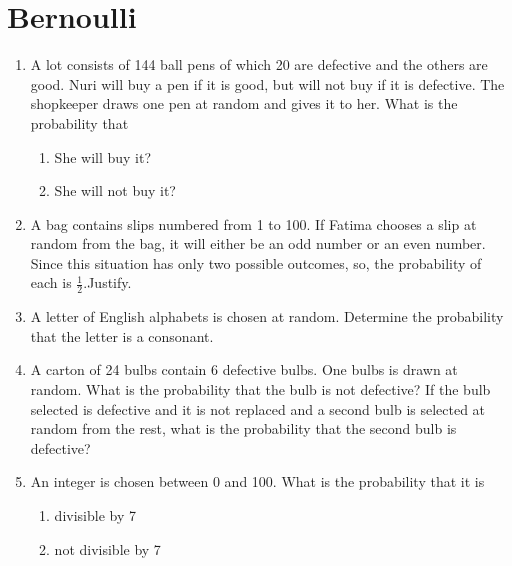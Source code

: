 \section{Bernoulli}
\begin{enumerate}[label=\thesection.\arabic*,ref=\thesection.\theenumi]
	\item A lot consists of 144 ball pens of which 20 are defective and the 
    others are good. Nuri will buy a pen if it is good, but will not buy if it 
    is defective. The shopkeeper draws one pen at random and gives it to her. 
    What is the probability that
    \begin{enumerate}
        \item She will buy it?
        \item She will not buy it?
    \end{enumerate}
\solution

\item A bag contains slips numbered from 1 to 100. If Fatima chooses a slip at random
from the bag, it will either be an odd number or an even number. Since this situation
has only two possible outcomes, so, the probability of each is $\frac{1}{2}$.Justify.\\
\solution

\item A letter of English alphabets is chosen at random. Determine the probability that the letter is a consonant.\\
    \solution
    
\item A carton of 24 bulbs contain 6 defective bulbs. One bulbs is drawn at random.
What is the probability that the bulb is not defective? If the bulb selected is defective
and it is not replaced and a second bulb is selected at random from the rest, what
is the probability that the second bulb is defective?\\
\solution

\item An integer is chosen between 0 and 100. What is the probability that it is 
	\begin{enumerate}
 		\item divisible by 7
   		\item not divisible by 7
     	\end{enumerate}
\solution

    \end{enumerate}
